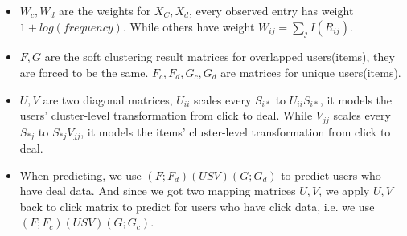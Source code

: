   \par{
    \begin{itemize}
    \item $W_c,W_d$ are the weights for $X_C, X_d$, every observed entry has weight $1 + log(frequency)$. While others have weight $W_{ij} = \sum_jI({R_{ij}})$.
    \item $F, G$ are the soft clustering result matrices for overlapped users(items), they are forced to be the same. $F_c,F_d,G_c,G_d$ are matrices for unique users(items).
    \item $U,V$ are two diagonal matrices, $U_{ii}$ scales every $S_{i*}$ to $U_{ii}S_{i*}$, it models the users' cluster-level transformation from click to deal. While $V_{jj}$ scales every $S_{*j}$ to $S_{*j}V_{jj}$, it models the items' cluster-level transformation from click to deal.
    \item When predicting, we use $(F;F_d)(USV)(G;G_d)$ to predict users who have deal data. And since we got two mapping matrices $U,V$, we apply $U,V$ back to click matrix to predict for users who have click data, i.e. we use $(F;F_c)(USV)(G;G_c)$.
    \end{itemize}
}



